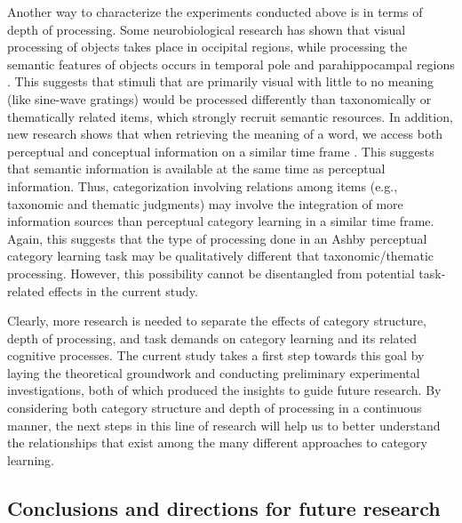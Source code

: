 \documentclass[../dissertation.tex]{subfiles}
\begin{document}
	Another way to characterize the experiments conducted above is in terms of depth of processing. Some neurobiological research has shown that visual processing of objects takes place in occipital regions, while processing the semantic features of objects occurs in temporal pole and parahippocampal regions \citep{Man2018}. This suggests that stimuli that are primarily visual with little to no meaning (like sine-wave gratings) would be processed differently than taxonomically or thematically related items, which strongly recruit semantic resources. In addition, new research shows that when retrieving the meaning of a word, we access both perceptual and conceptual information on a similar time frame \citep{Borghesani2019}. This suggests that semantic information is available at the same time as perceptual information. Thus, categorization involving relations among items (e.g., taxonomic and thematic judgments) may involve the integration of more information sources than perceptual category learning in a similar time frame. Again, this suggests that the type of processing done in an Ashby perceptual category learning task may be qualitatively different that taxonomic/thematic processing. However, this possibility cannot be disentangled from potential task-related effects in the current study.  \par 
	Clearly, more research is needed to separate the effects of category structure, depth of processing, and task demands on category learning and its related cognitive processes. The current study takes a first step towards this goal by laying the theoretical groundwork and conducting preliminary experimental investigations, both of which produced the insights to guide future research. By considering both category structure and depth of processing in a continuous manner, the next steps in this line of research will help us to better understand the relationships that exist among the many different approaches to category learning. 
	
\subsection{Conclusions and directions for future research}
\end{document}
